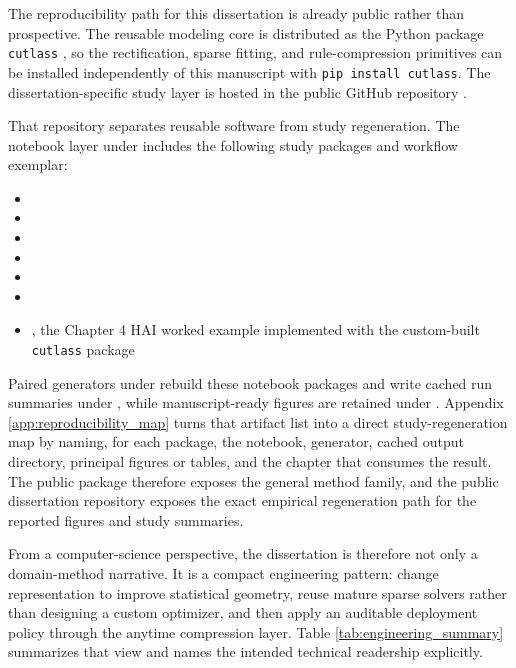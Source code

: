 The reproducibility path for this dissertation is already public rather than prospective. The reusable modeling core is distributed as the Python package \texttt{cutlass} \autocite{orender2026cutlass}, so the rectification, sparse fitting, and rule-compression primitives can be installed independently of this manuscript with \texttt{pip install cutlass}. The dissertation-specific study layer is hosted in the public GitHub repository \autocite{orender2026dissertationrepo}.

That repository separates reusable software from study regeneration. The notebook layer under  includes the following study packages and workflow exemplar:
\begin{itemize}
    \item {}
    \item {}
    \item {}
    \item {}
    \item {}
    \item {}
    \item {}, the Chapter 4 HAI  worked example implemented with the custom-built \texttt{cutlass} package
\end{itemize}
Paired generators under  rebuild these notebook packages and write cached run summaries under , while manuscript-ready figures are retained under . Appendix \ref{app:reproducibility_map} turns that artifact list into a direct study-regeneration map by naming, for each package, the notebook, generator, cached output directory, principal figures or tables, and the chapter that consumes the result. The public package therefore exposes the general method family, and the public dissertation repository exposes the exact empirical regeneration path for the reported figures and study summaries.

From a computer-science perspective, the dissertation is therefore not only a domain-method narrative. It is a compact engineering pattern: change representation to improve statistical geometry, reuse mature sparse solvers rather than designing a custom optimizer, and then apply an auditable deployment policy through the anytime compression layer. Table \ref{tab:engineering_summary} summarizes that view and names the intended technical readership explicitly.

